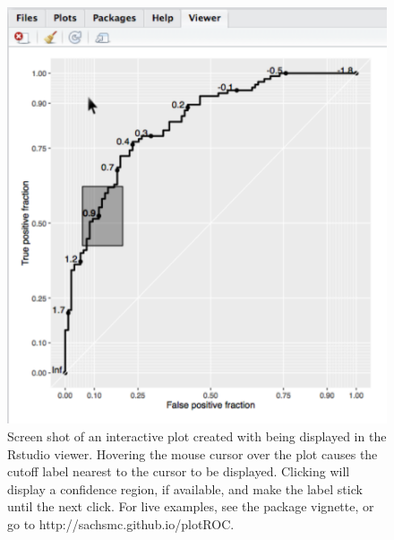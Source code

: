 \documentclass[codesnippet]{jss}
\begin{document}
\begin{figure}[ht]
\centering
\includegraphics{figure/screen-shot.pdf}
\caption{Screen shot of an interactive plot created with  being displayed in the Rstudio viewer. Hovering the mouse cursor over the plot causes the cutoff label nearest to the cursor to be displayed. Clicking will display a confidence region, if available, and make the label stick until the next click. For live examples, see the package vignette, or go to http://sachsmc.github.io/plotROC. \label{interact}}
\end{figure}
\end{document}
